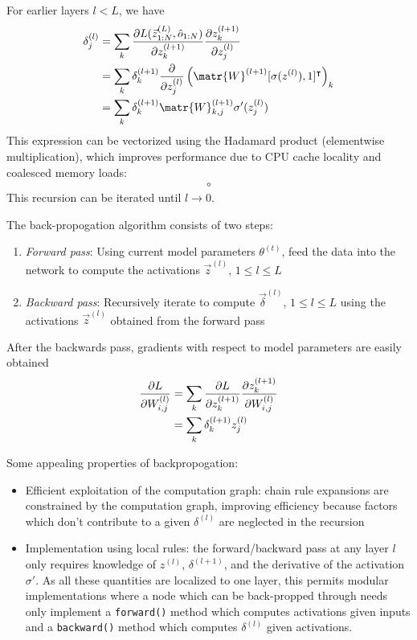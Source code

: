 For earlier layers $l < L$, we have
\begin{align}
    \delta^{(l)}_{j}
    &= \sum_k \frac{\pd L(\vec{z}^{(L)}_{1:N}, \hat{o}_{1:N})}{\pd z^{(l+1)}_k}
    \frac{\pd z^{(l+1)}_k}{\pd z^{(l)}_j}\\
    &= \sum_k \delta^{(l+1)}_k
    \frac{\pd}{\pd z^{(l)}_j} \left( \matr{W}^{(l+1)} [\sigma(z^{(l)}), 1]^\tp \right)_k \\
    &= \sum_k \delta^{(l+1)}_k
    \matr{W}^{(l+1)}_{k,j} \sigma'(z^{(l)}_j) \label{eq:backprop}
\end{align}
This expression can be vectorized using the Hadamard product (elementwise multiplication), which
improves performance due to CPU cache locality and coalesced memory loads: 
\begin{align}
    \circ
\end{align}
This recursion can be iterated until $l \to 0$.

The back-propogation algorithm consists of two steps:
\begin{enumerate}
    \item \emph{Forward pass}: Using current model parameters $\theta^{(t)}$,
        feed the data into the network to compute the activations $\vec{z}^{(l)}$,
        $1 \leq l \leq L$
    \item \emph{Backward pass}: Recursively iterate 
        to compute $\vec{\delta}^{(l)}$, $1 \leq l \leq L$ using the activations
        $\vec{z}^{(l)}$ obtained from the forward pass
\end{enumerate}

After the backwards pass, gradients with respect to model parameters are easily obtained
\begin{align}
    \frac{\partial L}{\partial W^{(l)}_{i,j} }
    &= \sum_k \frac{\partial L}{\partial z^{(l+1)}_k} \frac{\partial z^{(l+1)}_k}{\partial W^{(l)}_{i,j}} \\
    &= \sum_k \delta^{(l+1)}_k z^{(l)}_j
\end{align}

Some appealing properties of backpropogation:
\begin{itemize}
    \item Efficient exploitation of the computation graph: chain rule expansions
        are constrained by the computation graph, improving efficiency
        because factors which don't contribute to a given $\delta^{(l)}$
        are neglected in the recursion
    \item Implementation using local rules: the forward/backward pass
        at any layer $l$ only requires knowledge of $z^{(l)}$, $\delta^{(l+1)}$,
        and the derivative of the activation $\sigma'$. As all these quantities are localized
        to one layer, this permits modular implementations where a node which can be back-propped
        through needs only implement a \texttt{forward()} method which computes activations
        given inputs and a \texttt{backward()} method which computes $\delta^{(l)}$ given
        activations.
\end{itemize}

